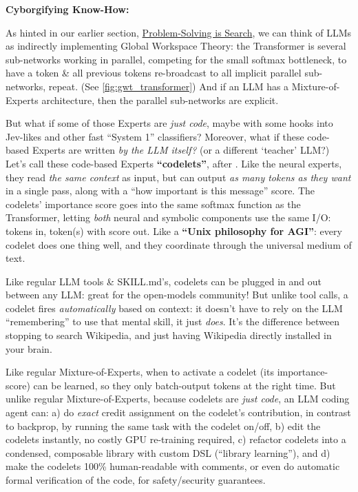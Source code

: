 \documentclass[11pt]{article}
\begin{document}
\textbf{Cyborgifying Know-How:}

As hinted in our earlier section, \hyperref[sec:search]{Problem-Solving is Search}, we can think of LLMs as indirectly implementing Global Workspace Theory: the Transformer is several sub-networks working in parallel, competing for the small softmax bottleneck, to have a token \& all previous tokens re-broadcast to all implicit parallel sub-networks, repeat. (See \autoref{fig:gwt_transformer}) And if an LLM has a Mixture-of-Experts architecture, then the parallel sub-networks are explicit.

But what if some of those Experts are \textit{just code}, maybe with some hooks into Jev-likes and other fast ``System 1'' classifiers? Moreover, what if these code-based Experts are written \textit{by the LLM itself?} (or a different `teacher' LLM?) Let's call these code-based Experts \textbf{``codelets''}, after \citet{copycat}. Like the neural experts, they read \textit{the same context} as input, but can output \textit{as many tokens as they want} in a single pass, along with a ``how important is this message'' score. The codelets' importance score goes into the same softmax function as the Transformer, letting \textit{both} neural and symbolic components use the same I/O: tokens in, token(s) with score out. Like a \textbf{``Unix philosophy for AGI''}: every codelet does one thing well, and they coordinate through the universal medium of text. 

Like regular LLM tools \& SKILL.md's, codelets can be plugged in and out between any LLM: great for the open-models community! But unlike tool calls, a codelet fires \textit{automatically} based on context: it doesn't have to rely on the LLM ``remembering'' to use that mental skill, it just \textit{does}. It's the difference between stopping to search Wikipedia, and just having Wikipedia directly installed in your brain.

Like regular Mixture-of-Experts, when to activate a codelet (its importance-score) can be learned, so they only batch-output tokens at the right time. But unlike regular Mixture-of-Experts, because codelets are \textit{just code}, an LLM coding agent can: a) do \textit{exact} credit assignment on the codelet's contribution, in contrast to backprop, by running the same task with the codelet on/off, b) edit the codelets instantly, no costly GPU re-training required, c) refactor codelets into a condensed, composable library with custom DSL (``library learning''), and d) make the codelets 100\% human-readable with comments, or even do automatic formal verification of the code, for safety/security guarantees.
\end{document}
